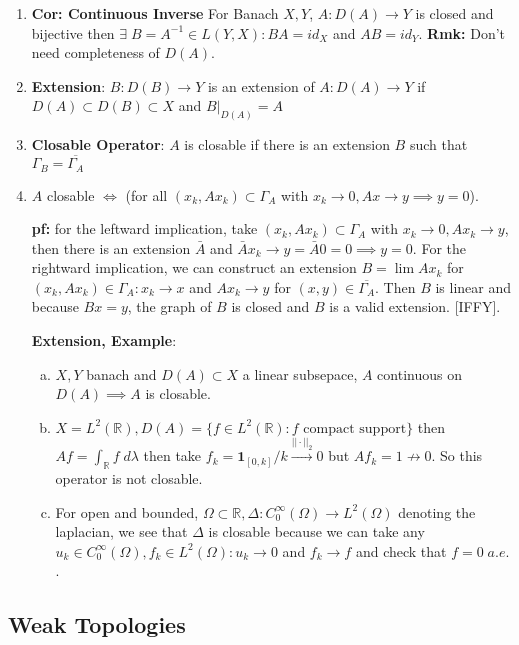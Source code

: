 \documentclass{article}
\begin{document}
\begin{enumerate}
    \item \textbf{Cor: Continuous Inverse} For Banach \(X, Y\), \(A:D(A) \to Y\) is closed and bijective then \(\exists \; B = A^{-1} \in L(Y,X):BA = id_X \) and \(AB = id_Y\). \textbf{Rmk:} Don't need completeness of \(D(A)\).

    \item \textbf{Extension}: \(B:D(B) \to Y\) is an extension of \(A:D(A) \to Y\) if \(D(A) \subset D(B) \subset X\) and \(B|_{D(A)} = A\)

    \item \textbf{Closable Operator}: \(A\) is closable if there is an extension \(B\) such that \(\Gamma_B = \overline{\Gamma_A}\)

    \item \(A\) closable \(\iff \) (for all \((x_k, Ax_k) \subset \Gamma_A\) with \(x_k \to 0, Ax\to y \implies y = 0\)).

    \textbf{pf:} for the leftward implication, take \((x_k, Ax_k) \subset \Gamma_A\) with \(x_k \to 0, Ax_k \to y\), then there is an extension \(\bar A\) and \(\bar Ax_k \to y = \bar A0 = 0 \implies y = 0\). For the rightward implication, we can construct an extension \(B = \lim Ax_k\) for \((x_k, Ax_k ) \in \Gamma_A:x_k \to x \) and \(Ax_k \to y\) for \((x, y) \in \overline{\Gamma_A}\). Then \(B\) is linear and because \(Bx = y\), the graph of \(B\) is closed and \(B\) is a valid extension. [IFFY].

    \textbf{Extension, Example}:
    \begin{enumerate} [a.]
        \item \(X, Y\) banach and \(D(A) \subset X\) a linear subsepace, \(A\) continuous on \(D(A) \implies A\) is closable.
        \item \(X = L^2(\mathbb{R}), D(A) = \{f \in L^2(\mathbb{R}):f \text{ compact support}\}\) then \(Af = \int_{\mathbb{R}}f\;d\lambda\) then take \(f_k = \mathbf{1}_{[0,k]}/k \overset{||\cdot||_2}\to 0\) but \(Af_k = 1 \not \to 0\). So this operator is not closable.
        \item For open and bounded, \(\Omega \subset \mathbb{R} ,  \Delta :C^\infty_0(\Omega)\to L^2(\Omega)\) denoting the laplacian, we see that \(\Delta\) is closable because we can take any \(u_k \in C^\infty_0(\Omega), f_k \in L^2(\Omega): u_k \to 0\) and \(f_k \to f\) and check that \(f = 0\; a.e.\).
    \end{enumerate}
\end{enumerate}

\subsection*{Weak Topologies}
\end{document}
